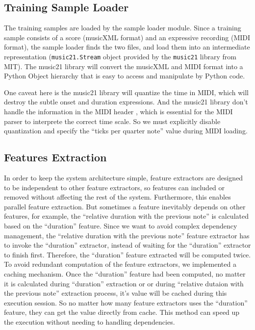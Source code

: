 
\subsection{Training Sample Loader}
   The training samples are loaded by the sample loader module. Since a training sample  consists of a score (musicXML format) and an expressive recording (MIDI format), the sample loader finds the two files, and load them into an intermediate representation (\texttt{music21.Stream} object provided by the \texttt{music21} library \cite{music21} from MIT). The music21 library will convert the musicXML and MIDI format into a Python Object hierarchy that is easy to access and manipulate by Python code. 

   One caveat here is the music21 library will quantize the time in MIDI, which will destroy the subtle onset and duration expressions. And the music21 library don't handle the  information in the MIDI header \cite{midispec}, which is essential for the MIDI parser to interprete the correct time scale. So we must explicitly disable quantization and specify the \enquote{ticks per quarter note} value during MIDI loading.

\subsection{Features Extraction}
In order to keep the system architecture simple, feature extractors are designed to be independent to other feature extractors, so features can included or removed without affecting the rest of the system. Furthermore, this enables parallel feature extraction. But sometimes a feature inevitably depends on other features, for example, the \enquote{relative duration with the previous note} is calculated based on the \enquote{duration} feature. Since we want to avoid complex dependency management, the \enquote{relative duration with the previous note} feature extractor has to invoke the \enquote{duration} extractor, instead of waiting for the \enquote{duration} extractor to finish first. Therefore, the \enquote{duration} feature extracted will be computed twice. To avoid redundant computation of the feature extractors, we implemented a caching mechanism. Once the \enquote{duration} feature had been computed, no matter it is calculated during \enquote{duration} extraction or or during \enquote{relative dutaion with the previous note} extraction process, it's value will be cached during this execution session. So no matter how many feature extractors uses the \enquote{duration} feature, they can get the value directly from cache. This method can speed up the execution without needing to handling dependencies.

